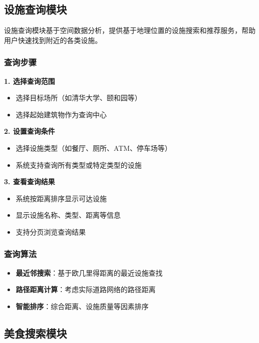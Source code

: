 \documentclass[12pt, a4paper]{article}
\begin{document}
\subsection{设施查询模块}

\begin{infobox}[title={智能设施查询}]
设施查询模块基于空间数据分析，提供基于地理位置的设施搜索和推荐服务，帮助用户快速找到附近的各类设施。
\end{infobox}

\subsubsection{查询步骤}

\textbf{1. 选择查询范围}
\begin{itemize}
    \item 选择目标场所（如清华大学、颐和园等）
    \item 选择起始建筑物作为查询中心
\end{itemize}

\textbf{2. 设置查询条件}
\begin{itemize}
    \item 选择设施类型（如餐厅、厕所、ATM、停车场等）
    \item 系统支持查询所有类型或特定类型的设施
\end{itemize}

\textbf{3. 查看查询结果}
\begin{itemize}
    \item 系统按距离排序显示可达设施
    \item 显示设施名称、类型、距离等信息
    \item 支持分页浏览查询结果
\end{itemize}

\subsubsection{查询算法}

\begin{itemize}
    \item \textbf{最近邻搜索}：基于欧几里得距离的最近设施查找
    \item \textbf{路径距离计算}：考虑实际道路网络的路径距离
    \item \textbf{智能排序}：综合距离、设施质量等因素排序
\end{itemize}

\subsection{美食搜索模块}
\end{document}
